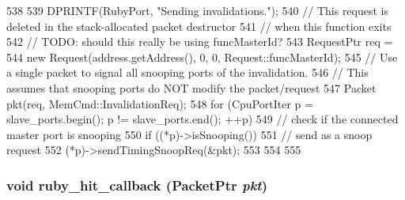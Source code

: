 \begin{DoxyCode}
538 {
539     DPRINTF(RubyPort, "Sending invalidations.\n");
540     // This request is deleted in the stack-allocated packet destructor
541     // when this function exits
542     // TODO: should this really be using funcMasterId?
543     RequestPtr req =
544             new Request(address.getAddress(), 0, 0, Request::funcMasterId);
545     // Use a single packet to signal all snooping ports of the invalidation.
546     // This assumes that snooping ports do NOT modify the packet/request
547     Packet pkt(req, MemCmd::InvalidationReq);
548     for (CpuPortIter p = slave_ports.begin(); p != slave_ports.end(); ++p) {
549         // check if the connected master port is snooping
550         if ((*p)->isSnooping()) {
551             // send as a snoop request
552             (*p)->sendTimingSnoopReq(&pkt);
553         }
554     }
555 }
\end{DoxyCode}
\hypertarget{classRubyPort_aa8ad1a5d600c338dcd76fcf434f3169e}{
\subsubsection[{ruby\_\-hit\_\-callback}]{\setlength{\rightskip}{0pt plus 5cm}void ruby\_\-hit\_\-callback ({\bf PacketPtr} {\em pkt})}}
\label{classRubyPort_aa8ad1a5d600c338dcd76fcf434f3169e}



